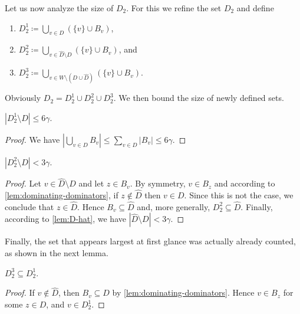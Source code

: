 \documentclass[a4paper,UKenglish,thm-restate,numberwithinsect]{lipics-v2021}
\newcommand{\commenttext}[1]{ \begin{center} {\fbox{\begin{minipage}[h]{0.9 \linewidth}   {\sf #1} \end{minipage} }} \end{center}}
\newcommand{\alex}[1]{{\color{blue}\commenttext{Alex: #1}}}
\begin{document}

Let us now analyze the size of $D_2$. For this we refine the set $D_2$
and define
\begin{tcolorbox}
  \begin{enumerate}
    \item $D_2^1\coloneqq \bigcup_{v\in D}
    (\{v\}\cup B_v)$, \\[-3mm]
    \item $D_2^2\coloneqq \bigcup_{v\in \hat{D}\setminus D}
    (\{v\}\cup B_v)$, and \\[-3mm]
    \item $D_2^3\coloneqq \bigcup_{v\in W\setminus (D\cup \hat{D})}
    (\{v\}\cup B_v)$.
  \end{enumerate}
\end{tcolorbox}

Obviously $D_2=D_2^1\cup D_2^2\cup D_2^3$. We then bound the size of
newly defined sets.

\begin{lemma}\label{lem:size-D21}
  $|D_2^1\setminus D|\leq 6\gamma$.
\end{lemma}
\begin{proof}
  We have $|\bigcup_{v\in D}B_v|\leq \sum_{v\in D}|B_v|\leq 6\gamma$.
\end{proof}

\begin{lemma}\label{lem:size-D22}
  $|D_2^2\setminus D|< 3\gamma$.
\end{lemma}
\begin{proof}
  Let $v\in \hat{D}\setminus D$ and let $z\in B_v$. By symmetry, $v\in B_z$ and
  according to \cref{lem:dominating-dominators}, if $z\not\in \hat{D}$ then $v\in D$.
  Since this is not the case, we conclude that $z\in\hat{D}$.
  Hence $B_v\subseteq \hat{D}$ and, more generally, $D_2^2\subseteq \hat{D}$.
  Finally, according to \cref{lem:D-hat}, we have $|\hat{D}\setminus D|<3\gamma$.
\end{proof}

Finally, the set that appears largest at first glance was actually
already counted, as shown in the next lemma.
\begin{lemma}\label{lem:size-D23}
  $D_2^3\subseteq D_2^1$.
\end{lemma}
\begin{proof}
  If $v\not\in \hat{D}$, then $B_v\subseteq D$ by \cref{lem:dominating-dominators}.
  Hence $v\in B_z$ for some $z\in D$, and $v\in D_2^1$.
\end{proof}
\end{document}

